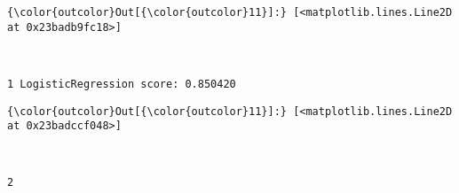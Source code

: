 \documentclass[11pt]{article}
\begin{document}
            \begin{Verbatim}[commandchars=\\\{\}]
{\color{outcolor}Out[{\color{outcolor}11}]:} [<matplotlib.lines.Line2D at 0x23badb9fc18>]
\end{Verbatim}
        
    \begin{center}
    \end{center}
    { \hspace*{\fill} \\}
    
    \begin{Verbatim}[commandchars=\\\{\}]
1 LogisticRegression score: 0.850420

    \end{Verbatim}

            \begin{Verbatim}[commandchars=\\\{\}]
{\color{outcolor}Out[{\color{outcolor}11}]:} [<matplotlib.lines.Line2D at 0x23badccf048>]
\end{Verbatim}
        
    \begin{center}
    \end{center}
    { \hspace*{\fill} \\}
    
    \begin{Verbatim}[commandchars=\\\{\}]
2 
    \end{Verbatim}

    \begin{Verbatim}[commandchars=\\\{\}]

    \end{Verbatim}
\end{document}
